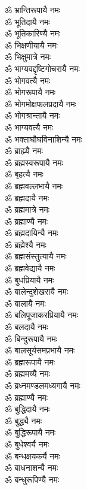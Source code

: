 \begin{flushleft}
\begin{multicols}{2}
ॐ भ्रान्तिरूपायै नमः\\
ॐ भूतिदायै नमः\\
ॐ भूतिकारिण्यै नमः\\
ॐ भिक्षणीयायै नमः\\
ॐ भिक्षुमात्रे नमः\\
ॐ भाग्यवद्दृष्टिगोचरायै नमः\\
ॐ भोगवत्यै नमः\\
ॐ भोगरूपायै नमः\\
ॐ भोगमोक्षफलप्रदायै नमः\\
ॐ भोगश्रान्तायै नमः\hfill{}\\
ॐ भाग्यवत्यै नमः\\
ॐ भक्ताघौघविनाशिन्यै नमः\\
ॐ ब्राह्म्यै नमः\\
ॐ ब्रह्मस्वरूपायै नमः\\
ॐ बृहत्यै नमः\\
ॐ ब्रह्मवल्लभायै नमः\\
ॐ ब्रह्मदायै नमः\\
ॐ ब्रह्ममात्रे नमः\\
ॐ ब्रह्माण्यै नमः\\
ॐ ब्रह्मदायिन्यै नमः\hfill{}\\
ॐ ब्रह्मेश्यै नमः\\
ॐ ब्रह्मसंस्तुत्यायै नमः\\
ॐ ब्रह्मवेद्यायै नमः\\
ॐ बुधप्रियायै नमः\\
ॐ बालेन्दुशेखरायै नमः\\
ॐ बालायै नमः\\
ॐ बलिपूजाकरप्रियायै नमः\\
ॐ बलदायै नमः\\
ॐ बिन्दुरूपायै नमः\\
ॐ बालसूर्यसमप्रभायै नमः\hfill{}\\
ॐ ब्रह्मरूपायै नमः\\
ॐ ब्रह्ममय्यै नमः\\
ॐ ब्रध्नमण्डलमध्यगायै नमः\\
ॐ ब्रह्माण्यै नमः\\
ॐ बुद्धिदायै नमः\\
ॐ बुद्ध्यै नमः\\
ॐ बुद्धिरूपायै नमः\\
ॐ बुधेश्वर्यै नमः\\
ॐ बन्धक्षयकर्यै नमः\\
ॐ बाधनाशन्यै नमः\hfill{}\\
ॐ बन्धुरूपिण्यै नमः\\

\end{multicols}
\end{flushleft}
